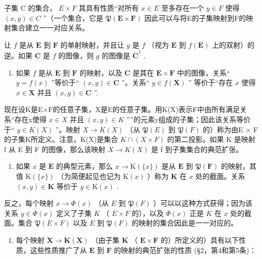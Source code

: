 子集 C 的集合， \(E \times F\) 其具有性质“对所有 \(x \in E\) 至多存在一个 \(y \in F\) 使得 \((x, y) \in C\) ''（一个集合，它是 \(\mathfrak{P}(\mathbf{E} \times \mathbf{F})\) 因此可以与将E的子集映射到F的映射集合建立一一对应关系。

让 \(f\) 是从 \(\mathbf{E}\) 到 \(\mathbf{F}\) 的单射映射，并且让 \(g\) 是 \(f\) （视为 \(\mathbf{E}\) 到 \(f(\mathbf{E})\) 上的双射）的逆。如果 \(\mathbf{C}\) 是 \(f\) 的图像，则 \(g\) 的图像是 \(\overline{\mathbf{C}}^1\) .

\begin{enumerate}
\def\labelenumi{\arabic{enumi}.}
\setcounter{enumi}{5}
\tightlist
\item
  如果 \(f\) 是从 \(\mathbf{E}\) 到 \(\mathbf{F}\) 的映射，以及 \(\mathbf{C}\) 是其在 \(\mathbf{E} \times \mathbf{F}\) 中的图像，关系“ \(y = f(x)\) ”等价于“ \((x, y) \in \mathbf{C}\) ''。关系“ \(y \in f(\mathbf{X})\) '' 等价于“存在 \(x\) 使得 \(x \in \mathbf{X}\) 并且 \((x, y) \in \mathbf{C}\) ''.
\end{enumerate}

现在设K是E×F的任意子集，X是E的任意子集。用K(X)表示F中由所有满足关系“存在x使得 \(x \in X\) 并且 \((x, y) \in K\) ''”的元素y组成的子集；因此该关系等价于`` \(y \in K(X)\) ''。映射 \(X \to K(X)\) （从 \(\mathfrak{P}(E)\) 到 \(\mathfrak{P}(F)\) 的）称为由E × F的子集K所定义。注意，K(X)是集合 \(K \cap (X \times F)\) 的第二投影。如果 K 是映射 f 从 E 到 F 的图像，那么该映射 \(X \to K(X)\) 是 f 到子集集合的典范扩张。

\begin{enumerate}
\def\labelenumi{\arabic{enumi}.}
\setcounter{enumi}{6}
\tightlist
\item
  如果 \(x\) 是 \(\mathbf{E}\) 的典型元素，那么 \(x \to \mathrm{K}(\{x\})\) 是从 \(\mathbf{E}\) 到 \(\mathfrak{P}(\mathbf{F})\) 的映射，其值 \(\mathrm{K}(\{x\})\) （为简便起见也记为 \(\mathrm{K}(x)\) ）称为 \(\mathbf{K}\) 在 \(x\) 处的截面。关系 \((x, y) \in \mathbf{K}\) 等价于 \(y \in \mathrm{K}(x)\) .
\end{enumerate}

反之，每个映射 \(x \to \Phi(x)\) （从 \(E\) 到 \(\mathfrak{P}(F)\) ）可以以这种方式获得；因为该关系 \(y \in \Phi(x)\) 定义了子集 \(K\) （ \(E \times F\) 的），以及 \(\Phi(x)\) 正是 \(K\) 在 \(x\) 处的截面。集合 \(\mathfrak{P}(E \times F)\) 以及 \(E\) 到 \(\mathfrak{P}(F)\) 的映射的集合因此是一一对应的。

\begin{enumerate}
\def\labelenumi{\arabic{enumi}.}
\setcounter{enumi}{7}
\tightlist
\item
  每个映射 \(\mathbf{X} \to \mathbf{K}(\mathbf{X})\) （由子集 \(\mathbf{K}\) （ \(\mathbf{E} \times \mathbf{F}\) 的）所定义的）具有以下性质，这些性质推广了从 \(\mathbf{E}\) 到 \(\mathbf{F}\) 的映射的典范扩张的性质 (§2，第4和第5条)：
\end{enumerate}

